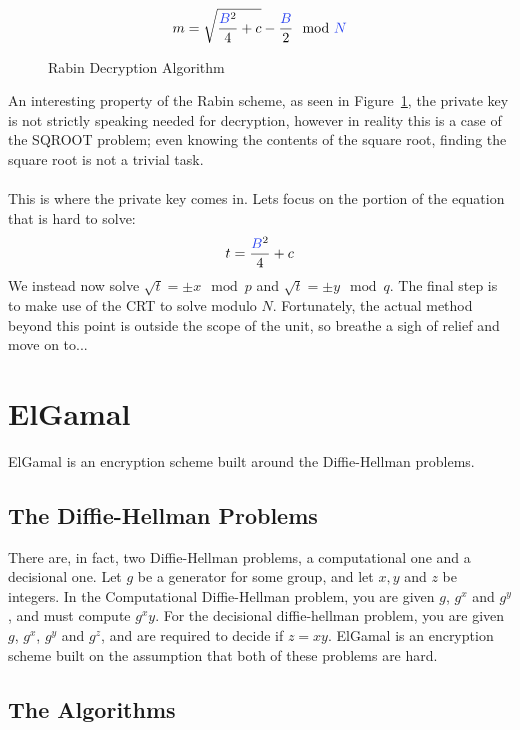   \begin{figure}[htp!]
		$$m = \sqrt{\frac{\textcolor{B}{B}^2}{4}+c} - \frac{\textcolor{B}{B}}{2} \mod \textcolor{B}{N}$$
  \caption{Rabin Decryption Algorithm}
  \label{fig:rabin-dec}
  \end{figure}
	An interesting property of the Rabin scheme, as seen in Figure~\ref{fig:rabin-dec}, the private key is not strictly speaking needed for decryption, however in reality this is a case of the SQROOT problem; even knowing the contents of the square root, finding the square root is not a trivial task.\\
	\\
	This is where the private key comes in. Lets focus on the portion of the equation that is hard to solve:
	$$t = \frac{\textcolor{B}{B}^2}{4}+c$$
	We instead now solve $\sqrt{t} = \pm x\mod p $ and $\sqrt{t} = \pm y \mod q$. The final step is to make use of the CRT to solve modulo $N$. Fortunately, the actual method beyond this point is outside the scope of the unit, so breathe a sigh of relief and move on to...

\section{ElGamal}
	ElGamal is an encryption scheme built around the Diffie-Hellman problems.

	\subsection{The Diffie-Hellman Problems}

	There are, in fact, two Diffie-Hellman problems, a computational one and a decisional one. Let $g$ be a generator for some group, and let $x, y$ and $z$ be integers. In the Computational Diffie-Hellman problem, you are given $g$, $g^x$ and $g^y$, and must compute $g^xy$. For the decisional diffie-hellman problem, you are given $g$, $g^x$, $g^y$ and $g^z$, and are required to decide if $z=xy$. ElGamal is an encryption scheme built on the assumption that both of these problems are hard.

	\subsection{The Algorithms}

